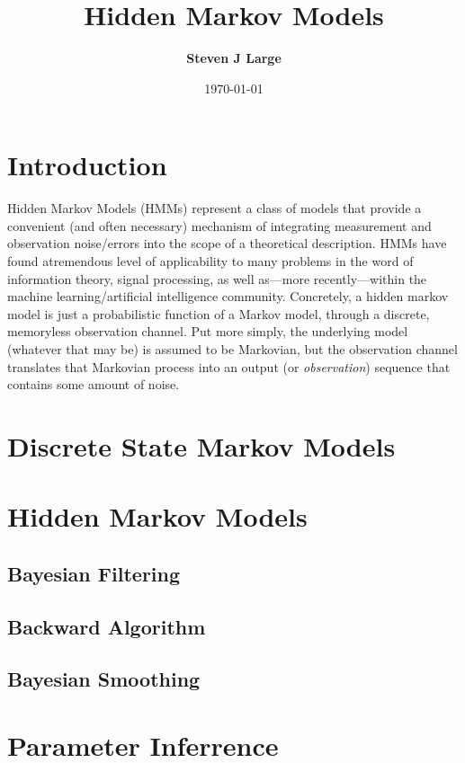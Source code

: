 \documentclass{article}
\title{\tga Hidden Markov Models}
\author{\bf \tga Steven J Large}
\date{\today}
\begin{document}
\maketitle
\tableofcontents
\pagebreak

\twocolumn
\sloppy

\section{Introduction}

Hidden Markov Models (HMMs) represent a class of models that provide a convenient (and often necessary) mechanism of integrating measurement and observation noise/errors into the scope of a theoretical description. HMMs have found atremendous level of applicability to many problems in the word of information theory, signal processing, as well as---more recently---within the machine learning/artificial intelligence community. Concretely, a hidden markov model is just a probabilistic function of a Markov model, through a discrete, memoryless observation channel. Put more simply, the underlying model (whatever that may be) is assumed to be Markovian, but the observation channel translates that Markovian process into an output (or \emph{observation}) sequence that contains some amount of noise. 

\section{Discrete State Markov Models}

\section{Hidden Markov Models}

\subsection{Bayesian Filtering}

\subsection{Backward Algorithm}

\subsection{Bayesian Smoothing}

\section{Parameter Inferrence}
\end{document}
